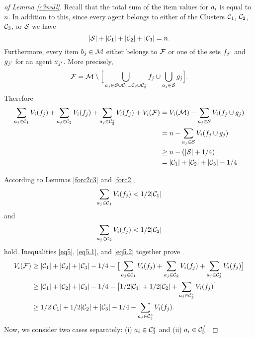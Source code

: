 \begin{proof}[of Lemma \ref{c3null}]
Recall that the total sum of the item values for $a_i$ is equal to $n$. In addition to this, since every agent belongs to either of the Clusters $\mathcal{C}_1$, $\mathcal{C}_2$, $\mathcal{C}_3$, or $\mathcal{S}$ we have $$|\mathcal{S}| + |\mathcal{C}_1| + |\mathcal{C}_2| + |\mathcal{C}_3| = n.$$ Furthermore, every item $b_j \in \mathcal{M}$ either belongs to $\mathcal{F}$ or one of the sets $f_{j'}$ and $g_{j'}$ for an agent $a_{j'}$. More precisely,
$$\mathcal{F} = \mathcal{M} \setminus \Big[\bigcup_{a_j \in \mathcal{S} \cup \mathcal{C}_1 \cup \mathcal{C}_2 \cup \mathcal{C}_3^s} f_j \cup \bigcup_{a_j \in \mathcal{S}} g_j\Big].$$ 
 Therefore
\begin{equation}\label{eq5}
\begin{split}
\sum_{a_j \in \mathcal{C}_1} V_i(f_j) + \sum_{a_j \in \mathcal{C}_2} V_i(f_j) + \sum_{a_j \in \mathcal{C}_3^s} V_i(f_j) + V_i({\mathcal{F}}) & = V_i(\mathcal{M}) - \sum_{a_j \in \mathcal{S}} V_i(f_j \cup g_j)\\
&= n - \sum_{a_j \in \mathcal{S}} V_i(f_j \cup g_j)\\
&\geq n - (|\mathcal{S}| + 1/4)\\
&= |\mathcal{C}_1| + |\mathcal{C}_2| + |\mathcal{C}_3|-1/4
\end{split}
\end{equation}

According to Lemmas \ref{forc2c3} and \ref{forc2},  
\begin{equation}\label{eq5.1}
\sum_{a_j \in \mathcal{C}_1} V_i(f_j) < {1/2}|\mathcal{C}_1|
\end{equation}
 and 
\begin{equation}\label{eq5.2}
\sum_{a_j \in \mathcal{C}_2} V_i(f_j)< {1/2} |\mathcal{C}_2|
\end{equation}
hold. Inequalities \eqref{eq5}, \eqref{eq5.1}, and \eqref{eq5.2} together prove
\begin{equation}\label{eq6}
\begin{split}
V_i({\mathcal{F}}) &\geq |\mathcal{C}_1| + |\mathcal{C}_2| + |\mathcal{C}_3|-1/4 - \big[\sum_{a_j \in \mathcal{C}_1} V_i(f_j) + \sum_{a_j \in \mathcal{C}_2} V_i(f_j) + \sum_{a_j \in \mathcal{C}_3^s} V_i(f_j)\big]\\
&\geq |\mathcal{C}_1| + |\mathcal{C}_2| + |\mathcal{C}_3|-1/4 - \big[1/2|\mathcal{C}_1| + 1/2|\mathcal{C}_2| + \sum_{a_j \in \mathcal{C}_3^s} V_i(f_j)\big]\\
&\geq 1/2 |\mathcal{C}_1| + 1/2 |\mathcal{C}_2| + |\mathcal{C}_3| -1/4 - \sum_{a_j \in \mathcal{C}_3^s} V_i(f_j).
\end{split}
\end{equation}
Now, we consider two cases separately: (i) $a_i \in \mathcal{C}_3^s$ and  (ii) $a_i \in \mathcal{C}_3^f$.



\end{proof}
